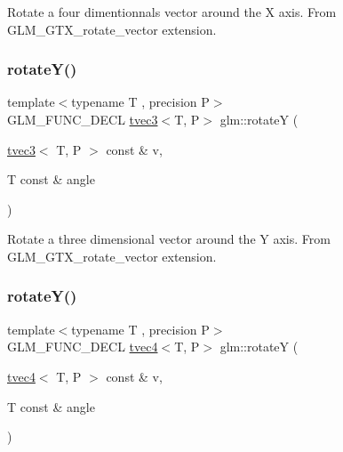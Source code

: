 Rotate a four dimentionnals vector around the X axis. From G\+L\+M\+\_\+\+G\+T\+X\+\_\+rotate\+\_\+vector extension. \mbox{\label{group__gtx__rotate__vector_gabb5d19eba5befeebcb35a0aad4a114e3}} 
\subsubsection{\texorpdfstring{rotate\+Y()}{rotateY()}\hspace{0.1cm}{\footnotesize\ttfamily [1/2]}}
{\footnotesize\ttfamily template$<$typename T , precision P$>$ \\
G\+L\+M\+\_\+\+F\+U\+N\+C\+\_\+\+D\+E\+CL \hyperlink{structglm_1_1tvec3}{tvec3}$<$T, P$>$ glm\+::rotateY (\begin{DoxyParamCaption}\item[{\hyperlink{structglm_1_1tvec3}{tvec3}$<$ T, P $>$ const \&}]{v,  }\item[{T const \&}]{angle }\end{DoxyParamCaption})}

Rotate a three dimensional vector around the Y axis. From G\+L\+M\+\_\+\+G\+T\+X\+\_\+rotate\+\_\+vector extension. \mbox{\label{group__gtx__rotate__vector_gae2507577c4bffa3548b32852791dd90c}} 
\subsubsection{\texorpdfstring{rotate\+Y()}{rotateY()}\hspace{0.1cm}{\footnotesize\ttfamily [2/2]}}
{\footnotesize\ttfamily template$<$typename T , precision P$>$ \\
G\+L\+M\+\_\+\+F\+U\+N\+C\+\_\+\+D\+E\+CL \hyperlink{structglm_1_1tvec4}{tvec4}$<$T, P$>$ glm\+::rotateY (\begin{DoxyParamCaption}\item[{\hyperlink{structglm_1_1tvec4}{tvec4}$<$ T, P $>$ const \&}]{v,  }\item[{T const \&}]{angle }\end{DoxyParamCaption})}

